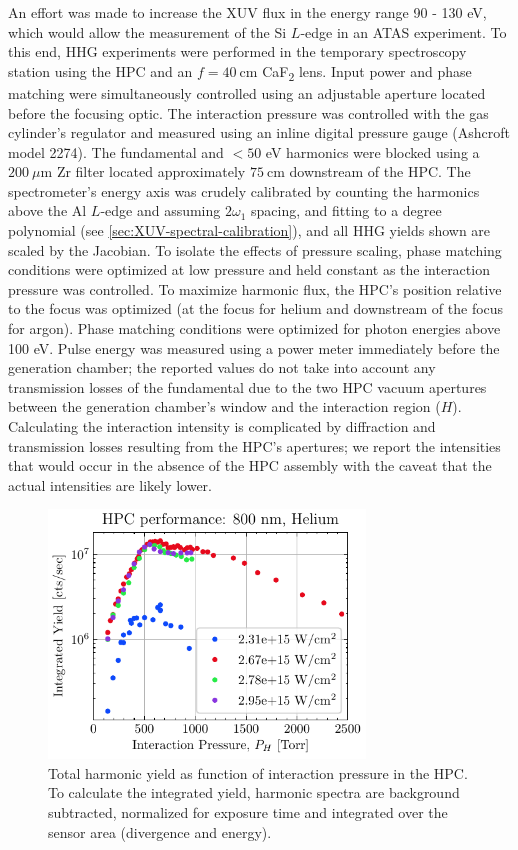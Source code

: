 An effort was made to increase the XUV flux in the energy range 90 - 130 eV, which would allow the measurement of the Si $L$-edge in an ATAS experiment. To this end, HHG experiments were performed in the temporary spectroscopy station using the HPC and an $f = 40 \ \textrm{cm}$ CaF\textsubscript{2} lens. Input power and phase matching were simultaneously controlled using an adjustable aperture located before the focusing optic. The interaction pressure was controlled with the gas cylinder's regulator and measured using an inline digital pressure gauge (Ashcroft model 2274). The fundamental and $<50$ eV harmonics were blocked using a $200 \ \mu\textrm{m}$ Zr filter located approximately $75 \ \textrm{cm}$ downstream of the HPC. The spectrometer's energy axis was crudely calibrated by counting the harmonics above the Al $L$-edge and assuming $2\omega_1$ spacing, and fitting to a  degree polynomial (see \cref{sec:XUV-spectral-calibration}), and all HHG yields shown are scaled by the Jacobian. To isolate the effects of pressure scaling, phase matching conditions were optimized at low pressure and held constant as the interaction pressure was controlled. To maximize harmonic flux, the HPC's position relative to the focus was optimized (at the focus for helium and downstream of the focus for argon). Phase matching conditions were optimized for photon energies above 100 eV. Pulse energy was measured using a power meter immediately before the generation chamber; the reported values do not take into account any transmission losses of the fundamental due to the two HPC vacuum apertures between the generation chamber's window and the interaction region ($H$). Calculating the interaction intensity is complicated by diffraction and transmission losses resulting from the HPC's apertures; we report the intensities that would occur in the absence of the HPC assembly with the caveat that the actual intensities are likely lower.

\begin{figure}
	\centering
	\includegraphics[width=0.75\textwidth]{figures/chap3/HPC_P_scaling_He800.pdf}
	\caption{Total harmonic yield as function of interaction pressure in the HPC. To calculate the integrated yield, harmonic spectra are background subtracted, normalized for exposure time and integrated over the sensor area (divergence and energy).}
	\label{fig:HPC_P_scaling_He800}
\end{figure}

